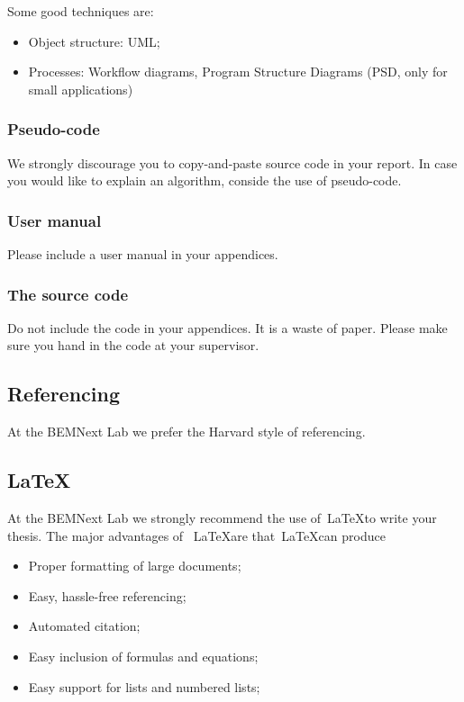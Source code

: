 \documentclass{latex-format/stylesheets/BEMNextstyle}
\begin{document}
Some good techniques are:
\begin{itemize}
\item Object structure: UML;
\item Processes: Workflow diagrams, Program Structure Diagrams (PSD, only for small applications)
\end{itemize}

\subsubsection*{Pseudo-code}
We strongly discourage you to copy-and-paste source code in your report. In case you would like to explain an algorithm, conside the use of pseudo-code.

\subsubsection*{User manual}
Please include a user manual in your appendices.

\subsubsection*{The source code}
Do not include the code in your appendices. It is a waste of paper. Please make sure you hand in the code at your supervisor.

\subsection*{Referencing}
At the BEMNext Lab we prefer the Harvard style of referencing.

\subsection*{\LaTeX}
At the BEMNext Lab we strongly recommend the use of~\LaTeX to write your thesis. The major advantages of ~\LaTeX are that~\LaTeX can produce 
\begin{itemize}
\item Proper formatting of large documents;
\item Easy, hassle-free referencing;
\item Automated citation;
\item Easy inclusion of formulas and equations;
\item Easy support for lists and numbered lists;
\end{itemize}
\end{document}
